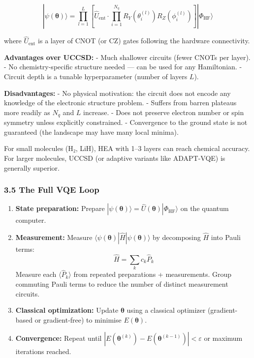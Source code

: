 \documentclass[
  11pt,
]{report}
\begin{document}
\[|\psi(\boldsymbol{\theta})\rangle = \prod_{l=1}^{L}\left[\hat{U}_{\text{ent}} \cdot \prod_{i=1}^{N_q} R_Y(\theta_i^{(l)}) R_Z(\phi_i^{(l)})\right] |\Phi_{\text{HF}}\rangle\]

where \(\hat{U}_{\text{ent}}\) is a layer of CNOT (or CZ) gates
following the hardware connectivity.

\textbf{Advantages over UCCSD:} - Much shallower circuits (fewer CNOTs
per layer). - No chemistry-specific structure needed --- can be used for
any Hamiltonian. - Circuit depth is a tunable hyperparameter (number of
layers \(L\)).

\textbf{Disadvantages:} - No physical motivation: the circuit does not
encode any knowledge of the electronic structure problem. - Suffers from
barren plateaus more readily as \(N_q\) and \(L\) increase. - Does not
preserve electron number or spin symmetry unless explicitly constrained.
- Convergence to the ground state is not guaranteed (the landscape may
have many local minima).

For small molecules (H₂, LiH), HEA with 1--3 layers can reach chemical
accuracy. For larger molecules, UCCSD (or adaptive variants like
ADAPT-VQE) is generally superior.

\subsubsection{3.5 The Full VQE Loop}\label{the-full-vqe-loop}

\begin{enumerate}
\def\labelenumi{\arabic{enumi}.}
\item
  \textbf{State preparation:} Prepare
  \(|\psi(\boldsymbol{\theta})\rangle = \hat{U}(\boldsymbol{\theta})|\Phi_{\text{HF}}\rangle\)
  on the quantum computer.
\item
  \textbf{Measurement:} Measure
  \(\langle\psi(\boldsymbol{\theta})|\hat{H}|\psi(\boldsymbol{\theta})\rangle\)
  by decomposing \(\hat{H}\) into Pauli terms:
  \[\hat{H} = \sum_k c_k \hat{P}_k\] Measure each
  \(\langle\hat{P}_k\rangle\) from repeated preparations + measurements.
  Group commuting Pauli terms to reduce the number of distinct
  measurement circuits.
\item
  \textbf{Classical optimization:} Update \(\boldsymbol{\theta}\) using
  a classical optimizer (gradient-based or gradient-free) to minimise
  \(E(\boldsymbol{\theta})\).
\item
  \textbf{Convergence:} Repeat until
  \(|E(\boldsymbol{\theta}^{(k)}) - E(\boldsymbol{\theta}^{(k-1)})| < \varepsilon\)
  or maximum iterations reached.
\end{enumerate}
\end{document}
